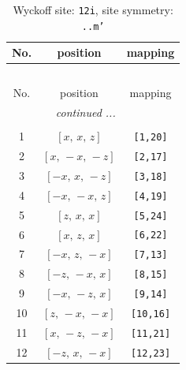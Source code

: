 \documentclass[fleqn,8pt]{jsarticle}
\begin{document}
\begin{longtable}{ccc}
\caption{Wyckoff site: {\tt 12i}, site symmetry: {\tt ..m'}}
 \\
 \hline \hline
No. & position & mapping \\ \hline \endfirsthead

\multicolumn{2}{l}{\tablename\ \thetable{}} \\
 \hline \hline
No. & position & mapping \\ \hline \endhead

 \hline \hline
\multicolumn{2}{r}{\footnotesize\it continued ...} \\ \endfoot

 \hline \hline
\multicolumn{2}{r}{} \\ \endlastfoot

1 & $\left[ x,\, x,\, z \right]$ & {\tt [1,20]} \\ \hline
2 & $\left[ x,\, - x,\, - z \right]$ & {\tt [2,17]} \\ \hline
3 & $\left[ - x,\, x,\, - z \right]$ & {\tt [3,18]} \\ \hline
4 & $\left[ - x,\, - x,\, z \right]$ & {\tt [4,19]} \\ \hline
5 & $\left[ z,\, x,\, x \right]$ & {\tt [5,24]} \\ \hline
6 & $\left[ x,\, z,\, x \right]$ & {\tt [6,22]} \\ \hline
7 & $\left[ - x,\, z,\, - x \right]$ & {\tt [7,13]} \\ \hline
8 & $\left[ - z,\, - x,\, x \right]$ & {\tt [8,15]} \\ \hline
9 & $\left[ - x,\, - z,\, x \right]$ & {\tt [9,14]} \\ \hline
10 & $\left[ z,\, - x,\, - x \right]$ & {\tt [10,16]} \\ \hline
11 & $\left[ x,\, - z,\, - x \right]$ & {\tt [11,21]} \\ \hline
12 & $\left[ - z,\, x,\, - x \right]$ & {\tt [12,23]} \\
\end{longtable}
\renewcommand{\arraystretch}{1.2}
\end{document}
